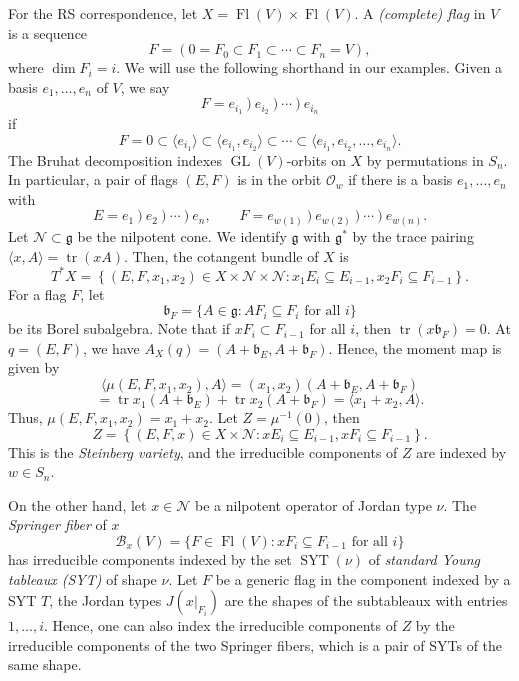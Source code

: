 \documentclass[12pt,a4paper]{article}
\def\Fl{\operatorname{Fl}}
\def\GL{\operatorname{GL}}
\def\FlVV{\Fl(V) \times \Fl(V)}
\def\tr{\operatorname{tr}}
\theoremstyle{plain}
\theoremstyle{definition}
\theoremstyle{remark}
\newcommand{\SYT}{\operatorname{SYT}}
\newcommand{\bfrak}{\mathfrak{b}}
\newcommand{\cN}{\mathcal{N}}
\newcommand{\cO}{\mathcal{O}}
\newcommand{\BB}{\mathcal{B}}
\def\gfrak{\mathfrak{g}}
\begin{document}
    For the RS correspondence, let $X = \FlVV$. A \textit{(complete) flag} in $V$ is a sequence
    \[
    F = (0 = F_0 \subset F_1 \subset \cdots \subset F_n = V),
    \]
    where $\dim F_i = i$. We will use the following shorthand in our examples. Given a basis $e_1,\ldots,e_n$ of $V$, we say
    \[
    F = e_{i_1}~)~e_{i_2}~)~\cdots ~)~e_{i_n}
    \]
    if
    \[
    F = 0 \subset \langle e_{i_1} \rangle \subset \langle e_{i_1},e_{i_2} \rangle \subset \cdots \subset \langle e_{i_1},e_{i_2},\ldots, e_{i_n} \rangle.
    \]
    The Bruhat decomposition indexes $\GL(V)$-orbits on $X$ by permutations in $S_n$. In particular, a pair of flags $(E,F)$ is in the orbit $\cO_w$ if there is a basis $e_1,\ldots,e_n$ with
    \[
    E = e_{1}~)~e_{2}~)~\cdots ~)~e_{n},\qquad
    F = e_{w(1)}~)~ e_{w(2)}~)~\cdots~)~e_{w(n)}.
    \]
    Let $\cN\subset \gfrak$ be the nilpotent cone. We identify $\gfrak$ with $\gfrak^*$ by the trace pairing $\langle x,A\rangle=\tr(xA)$. Then, the cotangent bundle of $X$ is
    \[
    T^*X = \left\{(E,F,x_1,x_2)\in X \times\cN \times\cN: x_1E_i \subseteq E_{i-1}, x_2F_i\subseteq F_{i-1}\right\}.
    \]
    For a flag $F$, let
    \[
    \bfrak_F=\{A\in\gfrak:AF_i\subseteq F_i\text{ for all }i\}
    \]
    be its Borel subalgebra. Note that if $xF_i\subset F_{i-1}$ for all $i$, then $\tr (x\bfrak_F) = 0$. At $q = (E,F)$, we have $A_X(q) = (A + \bfrak_E,A + \bfrak_F)$. Hence, the moment map is given by
    \[
    \langle\mu(E,F,x_1,x_2),A\rangle=(x_1,x_2)(A + \bfrak_E, A + \bfrak_F)
    \]
    \[
    = \tr x_1(A + \bfrak_E) + \tr x_2 (A + \bfrak_F) = \langle x_1 + x_2, A \rangle.
    \]
    Thus, $\mu(E,F,x_1,x_2) = x_1+x_2$. Let $Z = \mu^{-1}(0)$, then
    \[
    Z = \left\{(E,F,x)\in X \times\cN: xE_i \subseteq E_{i-1}, xF_i\subseteq F_{i-1}\right\}.
    \]
    This is the \textit{Steinberg variety}, and the irreducible components of $Z$ are indexed by $w\in S_n$.

    On the other hand, let $x\in \cN$ be a nilpotent operator of Jordan type $\nu$. The \textit{Springer fiber} of $x$
    \[
     \BB_x(V)=\{F\in \Fl(V):xF_i\subseteq F_{i-1}\text{ for all }i\}
    \]
    has irreducible components indexed by the set $\SYT(\nu)$ of \textit{standard Young tableaux (SYT)} of shape $\nu$. Let $F$ be a generic flag in the component indexed by a SYT $T$, the Jordan types $J(x|_{F_i})$ are the shapes of the subtableaux with entries $1,\ldots,i$. Hence, one can also index the irreducible components of $Z$ by the irreducible components of the two Springer fibers, which is a pair of SYTs of the same shape.
\end{document}
